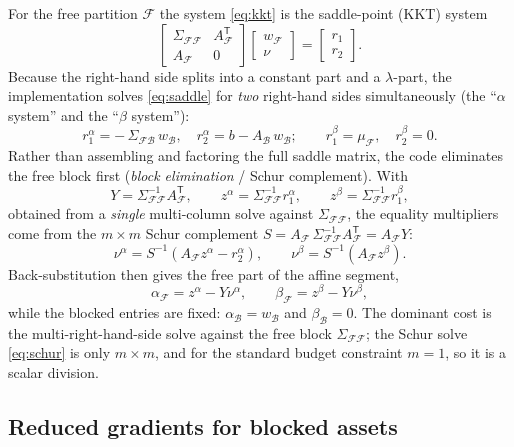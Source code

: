 \documentclass[11pt]{article}
\newcommand{\Sig}{\Sigma}
\newcommand{\F}{\mathcal{F}}        %
\newcommand{\B}{\mathcal{B}}        %
\newcommand{\trans}{^{\mathsf{T}}}
\newcommand{\inv}{^{-1}}
\begin{document}
For the free partition $\F$ the system \eqref{eq:kkt} is the saddle-point (KKT) system
\begin{equation}
\label{eq:saddle}
\begin{bmatrix} \Sig_{\F\F} & A_\F\trans \\[2pt] A_\F & 0 \end{bmatrix}
\begin{bmatrix} w_\F \\ \nu \end{bmatrix}
=
\begin{bmatrix} r_1 \\ r_2 \end{bmatrix}.
\end{equation}
Because the right-hand side splits into a constant part and a $\lambda$-part, the
implementation solves \eqref{eq:saddle} for \emph{two} right-hand sides simultaneously
(the ``$\alpha$ system'' and the ``$\beta$ system''):
\[
r_1^{\alpha} = -\,\Sig_{\F\B}\, w_\B, \quad r_2^{\alpha} = b - A_\B\, w_\B;
\qquad
r_1^{\beta} = \mu_\F, \quad r_2^{\beta} = 0 .
\]
Rather than assembling and factoring the full saddle matrix, the code eliminates the
free block first (\emph{block elimination} / Schur complement). With
\[
Y = \Sig_{\F\F}\inv A_\F\trans, \qquad
z^{\alpha} = \Sig_{\F\F}\inv r_1^{\alpha}, \qquad
z^{\beta} = \Sig_{\F\F}\inv r_1^{\beta},
\]
obtained from a \emph{single} multi-column solve against $\Sig_{\F\F}$, the equality
multipliers come from the $m\times m$ Schur complement
$S = A_\F\,\Sig_{\F\F}\inv A_\F\trans = A_\F Y$:
\begin{equation}
\label{eq:schur}
\nu^{\alpha} = S\inv\!\left(A_\F z^{\alpha} - r_2^{\alpha}\right),
\qquad
\nu^{\beta} = S\inv\!\left(A_\F z^{\beta}\right).
\end{equation}
Back-substitution then gives the free part of the affine segment,
\begin{equation}
\label{eq:freesoln}
\alpha_\F = z^{\alpha} - Y\nu^{\alpha},
\qquad
\beta_\F = z^{\beta} - Y\nu^{\beta},
\end{equation}
while the blocked entries are fixed: $\alpha_\B = w_\B$ and $\beta_\B = 0$. The
dominant cost is the multi-right-hand-side solve against the free block
$\Sig_{\F\F}$; the Schur solve \eqref{eq:schur} is only $m\times m$, and for the
standard budget constraint $m=1$, so it is a scalar division.

\subsection{Reduced gradients for blocked assets}
\end{document}
